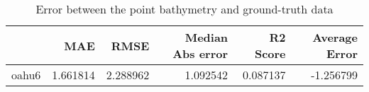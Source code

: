 \begin{table}[h!]
\caption{Error between the point bathymetry and ground-truth data}
\label{tab:oahu6_lidar_error}
\begin{tabular}{lrrrrr}
\toprule
 & MAE & RMSE & Median Abs error & R2 Score & Average Error \\
\midrule
oahu6 & 1.661814 & 2.288962 & 1.092542 & 0.087137 & -1.256799 \\
\bottomrule
\end{tabular}
\end{table}
